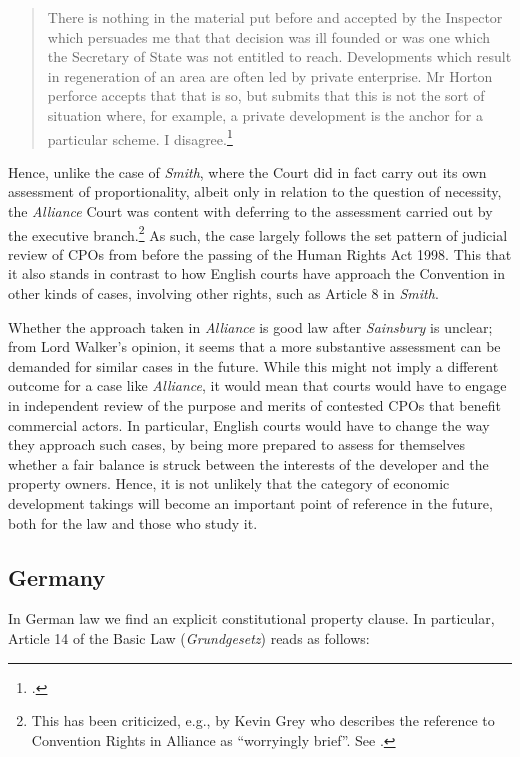\begin{quote}
There is nothing in the material put before and accepted by the Inspector which persuades me that that decision was ill founded or was one which the Secretary of State was not entitled to reach. Developments which result in regeneration of an area are often led by private enterprise. Mr Horton perforce accepts that that is so, but submits that this is not the sort of situation where, for example, a private development is the anchor for a particular scheme. I disagree.\footcite[19]{alliance06}
\end{quote}

Hence, unlike the case of {\it Smith}, where the Court did in fact carry out its own assessment of proportionality, albeit only in relation to the question of necessity, the {\it Alliance} Court was content with deferring to the assessment carried out by the executive branch.\footnote{This has been criticized, e.g., by Kevin Grey who describes the reference to Convention Rights in Alliance as ``worryingly brief''. See \cite{gray11}.} As such, the case largely follows the set pattern of judicial review of CPOs from before the passing of the Human Rights Act 1998. This  that it also stands in contrast to how English courts have approach the Convention in other kinds of cases, involving other rights, such as Article 8 in {\it Smith}. 

Whether the approach taken in {\it Alliance} is good law after {\it Sainsbury} is unclear; from Lord Walker's opinion, it seems that a more substantive assessment can be demanded for similar cases in the future. While this might not imply a different outcome for a case like {\it Alliance}, it would mean that courts would have to engage in independent review of the purpose and merits of contested CPOs that benefit commercial actors. In particular, English courts would have to change the way they approach such cases, by being more prepared to assess for themselves whether a fair balance is struck between the interests of the developer and the property owners. Hence, it is not unlikely that the category of economic development takings will become an important point of reference in the future, both for the law and those who study it.

\subsection{Germany}\label{sec:germany}

In German law we find an explicit constitutional property clause. In particular, Article 14 of the Basic Law ({\it Grundgesetz}) reads as follows:

